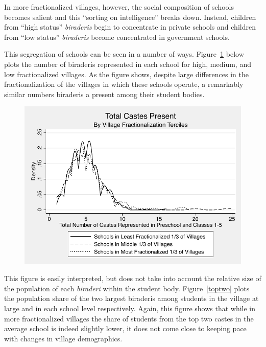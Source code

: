 \documentclass[12pt]{article}
\begin{document}


In more fractionalized villages, however, the social composition of schools becomes salient and this ``sorting on intelligence'' breaks down. Instead, children from ``high status'' \emph{biraderis} begin to concentrate in private schools and children from ``low status'' \emph{biraderis} become concentrated in government schools.

This segregation of schools can be seen in a number of ways. Figure~\ref{numcastes} below plots the number of biraderis represented in each school for high, medium, and low fractionalized villages. As the figure shows, despite large differences in the fractionalization of the villages in which these schools operate, a remarkably similar numbers biraderis a present among their student bodies.

\begin{figure}[H]
	\begin{center}
	\caption{}\label{numcastes}
	\includegraphics[scale=1.0]{graphs/totalpresent.pdf}
	\end{center}
\end{figure}

This figure is easily interpreted, but does not take into account the relative size of the population of each \emph{biraderi} within the student body. Figure~\ref{toptwo} plots the population share of the two largest biraderis among students in the village at large and in each school level respectively. Again, this figure shows that while in more fractionalized villages the share of students from the top two castes in the average school is indeed slightly lower, it does not come close to keeping pace with changes in village demographics.
\end{document}
